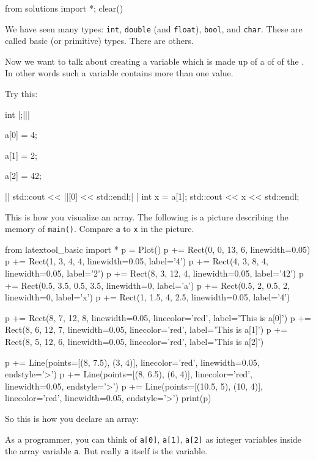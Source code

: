 \begin{python0}
from solutions import *; clear()
\end{python0}

We have seen many types: \texttt{int}, \texttt{double} (and \texttt{float}), \texttt{bool}, and \texttt{char}. These are called basic (or primitive) types. There are others.

Now we want to talk about creating a variable which is made up of a  of  of the . In other words such a variable contains more than one value.

Try this:
\begin{consolethree}[escapeinside=||]
int |\EMPHASIZE{[3]};|||
       
a[0] = 4;

a[1] = 2;

a[2] = 42;

||
std::cout << ||[0] << std::endl;|
|
int x = a[1];
std::cout << x << std::endl;  
\end{consolethree}

\newpage
This is how you visualize an array. The following is a picture describing the memory of \texttt{main()}. Compare \texttt{a} to \texttt{x} in the picture.
\begin{python}
from latextool_basic import *
p = Plot()
p += Rect(0, 0, 13, 6, linewidth=0.05)
p += Rect(1, 3, 4, 4, linewidth=0.05, label='4')
p += Rect(4, 3, 8, 4, linewidth=0.05, label='2')
p += Rect(8, 3, 12, 4, linewidth=0.05, label='42')
p += Rect(0.5, 3.5, 0.5, 3.5, linewidth=0, label='a')
p += Rect(0.5, 2, 0.5, 2, linewidth=0, label='x')
p += Rect(1, 1.5, 4, 2.5, linewidth=0.05, label='4')

p += Rect(8, 7, 12, 8, linewidth=0.05, linecolor='red', label='This is a[0]')
p += Rect(8, 6, 12, 7, linewidth=0.05, linecolor='red', label='This is a[1]')
p += Rect(8, 5, 12, 6, linewidth=0.05, linecolor='red', label='This is a[2]')

p += Line(points=[(8, 7.5), (3, 4)], linecolor='red', linewidth=0.05, endstyle='>')
p += Line(points=[(8, 6.5), (6, 4)], linecolor='red', linewidth=0.05, endstyle='>')
p += Line(points=[(10.5, 5), (10, 4)], linecolor='red', linewidth=0.05, endstyle='>')
print(p)
\end{python}
So this is how you declare an array:
\begin{center}
\end{center}
As a programmer, you can think of \texttt{a[0]}, \texttt{a[1]}, \texttt{a[2]} as integer variables inside the array variable \texttt{a}. But really \texttt{a} itself is the variable.

